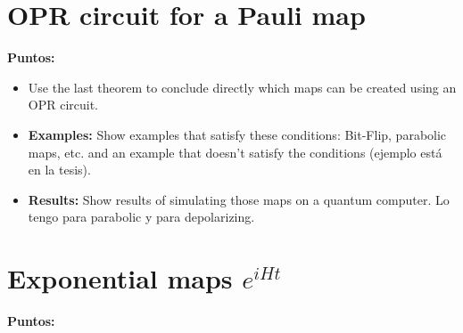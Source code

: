 \documentclass[10pt,letterpaper]{article} %
\begin{document}
\section{OPR circuit for a Pauli map} %
\label{sec: OPR circuit for a Pauli map}
\textbf{Puntos:}
\begin{itemize}
\item Use the last theorem to conclude directly which maps can be created using an OPR circuit.
\item \textbf{Examples:} Show examples that satisfy these conditions: Bit-Flip, parabolic maps, etc. 
and an example that doesn't satisfy the conditions (ejemplo está en la tesis).
\item \textbf{Results:} Show results of simulating those maps on a quantum computer. 
Lo tengo para parabolic y para depolarizing.
\end{itemize}
\section{Exponential maps $e^{iHt}$} %
\label{sec: Exponential maps}
\textbf{Puntos:}
\end{document}
